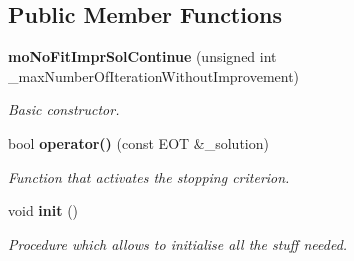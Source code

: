 \subsection*{Public Member Functions}
\begin{CompactItemize}
\item 
{\bf mo\-No\-Fit\-Impr\-Sol\-Continue} (unsigned int \_\-max\-Number\-Of\-Iteration\-Without\-Improvement)
\begin{CompactList}\small\item\em Basic constructor. \item\end{CompactList}\item 
bool {\bf operator()} (const EOT \&\_\-solution)
\begin{CompactList}\small\item\em Function that activates the stopping criterion. \item\end{CompactList}\item 
void {\bf init} ()
\begin{CompactList}\small\item\em Procedure which allows to initialise all the stuff needed. \item\end{CompactList}\end{CompactItemize}
